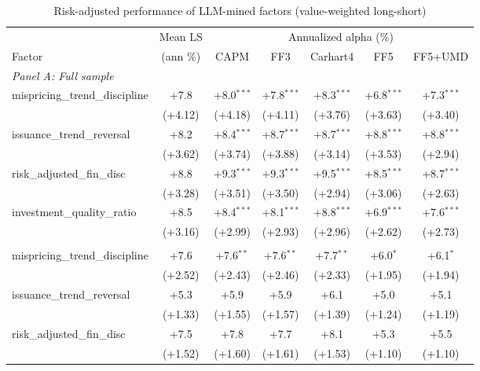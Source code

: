 \begin{table}[htbp]\centering
\caption{Risk-adjusted performance of LLM-mined factors (value-weighted long-short)}
\label{tab:alphas_vw}
\begin{threeparttable}\footnotesize
\begin{tabular}{lcccccc}
\toprule
 & Mean LS & \multicolumn{5}{c}{Annualized alpha (\%)} \\
\cmidrule(lr){3-7}
Factor & (ann \%) & CAPM & FF3 & Carhart4 & FF5 & FF5+UMD \\
\midrule
\multicolumn{7}{l}{\textit{Panel A: Full sample}} \\
\addlinespace
mispricing\_trend\_discipline & +7.8 & +8.0$^{***}$ & +7.8$^{***}$ & +8.3$^{***}$ & +6.8$^{***}$ & +7.3$^{***}$ \\
 & (+4.12) & (+4.18) & (+4.11) & (+3.76) & (+3.63) & (+3.40) \\
\addlinespace
issuance\_trend\_reversal & +8.2 & +8.4$^{***}$ & +8.7$^{***}$ & +8.7$^{***}$ & +8.8$^{***}$ & +8.8$^{***}$ \\
 & (+3.62) & (+3.74) & (+3.88) & (+3.14) & (+3.53) & (+2.94) \\
\addlinespace
risk\_adjusted\_fin\_disc & +8.8 & +9.3$^{***}$ & +9.3$^{***}$ & +9.5$^{***}$ & +8.5$^{***}$ & +8.7$^{***}$ \\
 & (+3.28) & (+3.51) & (+3.50) & (+2.94) & (+3.06) & (+2.63) \\
\addlinespace
investment\_quality\_ratio & +8.5 & +8.4$^{***}$ & +8.1$^{***}$ & +8.8$^{***}$ & +6.9$^{***}$ & +7.6$^{***}$ \\
 & (+3.16) & (+2.99) & (+2.93) & (+2.96) & (+2.62) & (+2.73) \\
\addlinespace
\midrule
\multicolumn{7}{l}{\textit{Panel B: Out-of-sample (post-2000-12-31)}} \\
\addlinespace
mispricing\_trend\_discipline & +7.6 & +7.6$^{**}$ & +7.6$^{**}$ & +7.7$^{**}$ & +6.0$^{*}$ & +6.1$^{*}$ \\
 & (+2.52) & (+2.43) & (+2.46) & (+2.33) & (+1.95) & (+1.94) \\
\addlinespace
issuance\_trend\_reversal & +5.3 & +5.9 & +5.9 & +6.1 & +5.0 & +5.1 \\
 & (+1.33) & (+1.55) & (+1.57) & (+1.39) & (+1.24) & (+1.19) \\
\addlinespace
risk\_adjusted\_fin\_disc & +7.5 & +7.8 & +7.7 & +8.1 & +5.3 & +5.5 \\
 & (+1.52) & (+1.60) & (+1.61) & (+1.53) & (+1.10) & (+1.10) \\

\end{tabular}
\end{threeparttable}
\end{table}
